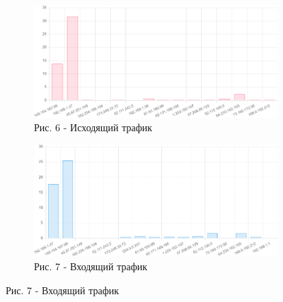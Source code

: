 \begin{figure}[H]
    \centering
    \begin{subfigure}[b]{0.45\textwidth}
        \centering
        \includegraphics[width=\textwidth]{assets/52}
		\caption*{Рис. 6 - Исходящий трафик}
    \end{subfigure}
    \hfill
    \begin{subfigure}[b]{0.45\textwidth}
        \centering
        \includegraphics[width=\textwidth]{assets/52.1}
		\caption*{Рис. 7 - Входящий трафик}
    \end{subfigure}
\end{figure}

